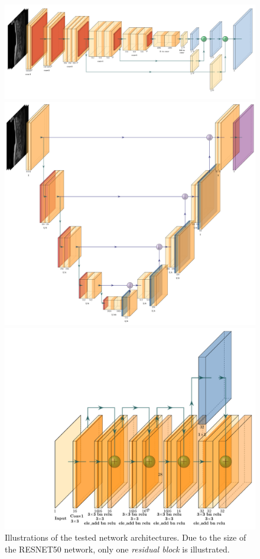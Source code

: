 \begin{figure}
    \centering
    \centering
    \begin{minipage}{.99\textwidth}
        \includegraphics[width=.99\textwidth]{images/VGG16_FCN8.pdf}
    \end{minipage} 
    \begin{minipage}{.99\textwidth}
        \includegraphics[width=.99\textwidth]{images/UNET.pdf}
    \end{minipage} 
    \begin{minipage}{.99\textwidth}
        \includegraphics[width=.7\textwidth]{images/RESNET.pdf}
    \end{minipage} 
    \caption{Illustrations of the tested network architectures.
    Due to the size of the RESNET50 network, only one \textit{residual block} is illustrated.
    \label{fig:vgg16}}
\end{figure}


